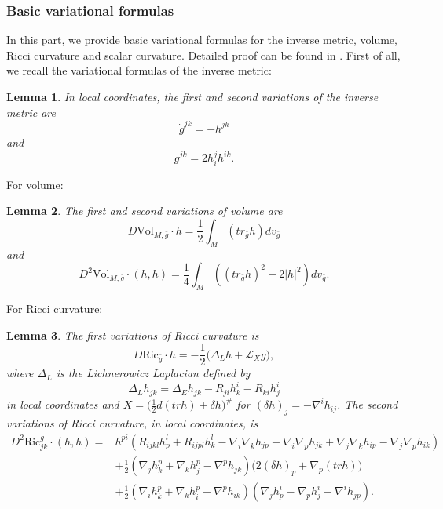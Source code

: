 \documentclass[12pt]{amsart}
\newtheorem{lemma}{Lemma}[section]
\newcommand{\bg}{\bar{g}}
\numberwithin{equation}{section}
\begin{document}
\subsubsection{Basic variational formulas}

In this part, we provide basic variational formulas for the inverse metric, volume, Ricci curvature and scalar curvature. Detailed proof can be found in \cite{Yuan_ph_D, Yuan_VolumeCW}.  First of all, we recall the variational formulas of the inverse metric:
\begin{lemma}\label{Lemma: variation_of_metrics}
    In local coordinates, the first and second variations of the inverse metric are
    \begin{equation*}
        \dot{g}^{jk}=-h^{jk}
    \end{equation*}
    and
    \begin{equation*}
        \ddot{g}^{jk}=2h_i^jh^{ik}.
    \end{equation*}
\end{lemma}
For volume:
\begin{lemma}\label{Lemma: variation_of_volume}
    The first and second variations of volume are
    \begin{equation*}
        D \mathrm{Vol}_{M,\bg} \cdot h=\frac{1}{2}\int_M \left( tr_{\bg} h \right) dv_{\bg}
    \end{equation*}
    and
    \begin{equation*}
        D^2 \mathrm{Vol}_{M,\bg} \cdot (h,h) = \frac{1}{4} \int_M \left( \left( tr_{\bg}h \right)^2-2|h|^2 \right) dv_{\bg}.
    \end{equation*}
\end{lemma}
For Ricci curvature:
\begin{lemma}\label{Lemma: variation_of_Ricci}
    The first variations of Ricci curvature is
    \begin{equation*}
        D \mathrm{Ric}_{\bg}\cdot h=-\frac{1}{2}\big(\Delta_Lh+\mathscr{L}_X\bg\big),
    \end{equation*}
    where $\Delta_L$ is the Lichnerowicz Laplacian defined by
    \begin{equation*}
        \Delta_L h_{jk}=\Delta_E h_{jk} - R_{ji} h_k^i-R_{ki}h_j^i
    \end{equation*}
    in local coordinates and $X=\big(\frac{1}{2}d(trh)+\delta h\big)^{\#}$ for $(\delta h)_j=-\nabla^ih_{ij}$. The second variations of Ricci curvature, in local coordinates, is
    \begin{equation*}
    \begin{split}
        D^2 \mathrm{Ric}^{\bg}_{jk}\cdot(h,h)=&h^{pi}(R_{ijkl}h_p^l+R_{ijpl}h_k^l-\nabla_i\nabla_kh_{jp}+\nabla_i\nabla_ph_{jk}+\nabla_j\nabla_kh_{ip}-\nabla_j\nabla_ph_{ik})\\
        &+\frac{1}{2}(\nabla_jh_k^p+\nabla_kh_j^p-\nabla^ph_{jk})\big(2(\delta h)_p+\nabla_p(trh)\big)\\
        &+\frac{1}{2}(\nabla_ih_k^p+\nabla_kh_i^p-\nabla^ph_{ik})(\nabla_jh_p^i-\nabla_ph_j^i+\nabla^ih_{jp}).
    \end{split}
    \end{equation*}
\end{lemma}
\end{document}
